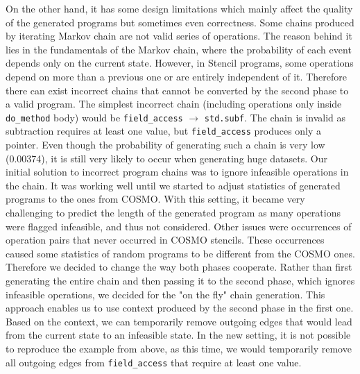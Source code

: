 \documentclass[sigplan,\review anonymous]{acmart}
\begin{document}
On the other hand, it has some design limitations which mainly affect the
quality of the generated programs but sometimes even correctness. Some chains
produced by iterating Markov chain are not valid series of operations. The
reason behind it lies in the fundamentals of the Markov chain, where the
probability of each event depends only on the current state. However, in
Stencil programs, some operations depend on more than a previous one or are
entirely independent of it. Therefore there can exist incorrect chains that
cannot be converted by the second phase to a valid program. The simplest
incorrect chain (including operations only inside \texttt{do\_method} body)
would be \texttt{field\_access} $\rightarrow$ \texttt{std.subf}. The chain
is invalid as subtraction requires at least one value, but
\texttt{field\_access} produces only a pointer. Even though the probability
of generating such a chain is very low (0.00374), it is still very likely to
occur when generating huge datasets. Our initial solution to incorrect
program chains was to ignore infeasible operations in the chain. It was
working well until we started to adjust statistics of generated programs to
the ones from COSMO. With this setting, it became very challenging to predict
the length of the generated program as many operations were flagged infeasible,
and thus not considered. Other issues were occurrences of operation pairs that
never occurred in COSMO stencils. These occurrences caused some statistics of
random programs to be different from the COSMO ones. Therefore we decided to
change the way both phases cooperate. Rather than first generating the entire
chain and then passing it to the second phase, which ignores infeasible
operations, we decided for the "on the fly" chain generation. This approach
enables us to use context produced by the second phase in the first one. Based
on the context, we can temporarily remove outgoing edges that would lead from
the current state to an infeasible state. In the new setting, it is not
possible to reproduce the example from above, as this time, we would
temporarily remove all outgoing edges from \texttt{field\_access} that
require at least one value.
\end{document}
